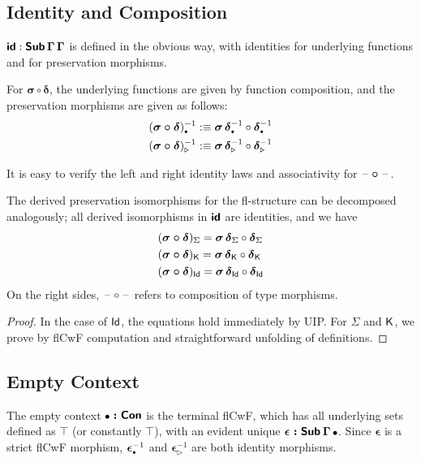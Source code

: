 \documentclass[sigplan,review,anonymous]{acmart}\settopmatter{printfolios=true,printccs=false,printacmref=false}
\newcommand{\ext}{\triangleright}
\newcommand{\emptycon}{\scaleobj{.75}\bullet}
\newcommand{\bSub}{\boldsymbol{\Sub}}
\newcommand{\bGamma}{\boldsymbol{\Gamma}}
\newcommand{\bsigma}{\boldsymbol{\sigma}}
\newcommand{\bdelta}{\boldsymbol{\delta}}
\newcommand{\bepsilon}{\boldsymbol{\epsilon}}
\newcommand{\bid}{\boldsymbol{\id}}
\begin{document}
\subsection{Identity and Composition}
\label{sec:idcomp}

$\bid : \bSub\,\bGamma\,\bGamma$ is defined in the obvious way, with identities for
underlying functions and for preservation morphisms.

For $\boldsymbol{\sigma \circ \delta}$, the underlying functions are given by
function composition, and the preservation morphisms are given as follows:
\begin{alignat*}{3}
  & (\boldsymbol{\sigma \circ \delta})_{\emptycon}^{-1} :\equiv
    \bsigma\,\bdelta_{\emptycon}^{-1} \circ \bdelta_{\emptycon}^{-1} \\
  & (\boldsymbol{\sigma \circ \delta})_{\ext}^{-1} :\equiv
    \bsigma\,\bdelta_{\ext}^{-1} \circ \bdelta_{\ext}^{-1}
\end{alignat*}

It is easy to verify the left and right identity laws and associativity for $\boldsymbol{\mathord{\hspace{1pt}\text{--}\hspace{1pt}}\circ\mathord{\hspace{1pt}\text{--}\hspace{1pt}}}$.

\begin{lemma}\label{lem:idcomppres} The derived preservation isomorphisms for the fl-structure can be decomposed analogously; all derived isomorphisms in $\bid$ are identities, and we have
\begin{alignat*}{3}
  & (\boldsymbol{\sigma \circ \delta})_{\Sigma} =
  \bsigma\,\bdelta_{\Sigma} \circ \bdelta_{\Sigma}\\
  & (\boldsymbol{\sigma \circ \delta})_{\K} =
  \bsigma\,\bdelta_{\K} \circ \bdelta_{\K}\\
  & (\boldsymbol{\sigma \circ \delta})_{\Id} =
  \bsigma\,\bdelta_{\Id} \circ \bdelta_{\Id}
\end{alignat*}
On the right sides, $\mathord{\hspace{1pt}\text{--}\hspace{1pt}}\circ\mathord{\hspace{1pt}\text{--}\hspace{1pt}}$ refers to composition of type morphisms.
\end{lemma}
\begin{proof} In the case of $\mathsf{Id}$, the equations hold immediately by UIP. For $\Sigma$ and $\mathsf{K}$, we prove by flCwF computation and straightforward unfolding of definitions.
\end{proof}

\subsection{Empty Context}
The empty context $\boldsymbol{\emptycon : \Con}$ is the terminal flCwF, which
has all underlying sets defined as $\top$ (or constantly $\top$), with an
evident unique $\boldsymbol{\epsilon : \Sub\,\Gamma\,\emptycon}$. Since
$\bepsilon$ is a strict flCwF morphism, $\bepsilon_{\emptycon}^{-1}$ and
$\bepsilon_{\ext}^{-1}$ are both identity morphisms.
\end{document}
